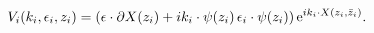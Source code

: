 \begin{equation}
V_i(k_i,\epsilon_i, z_i) = ( \epsilon\cdot \partial X(z_i) + i
k_i\cdot \psi(z_i) \, \epsilon_i\cdot\psi(z_i) )\,  {\rm e}^{ i
k_i \cdot X(z_i, \bar z_i)} .
\end{equation}

